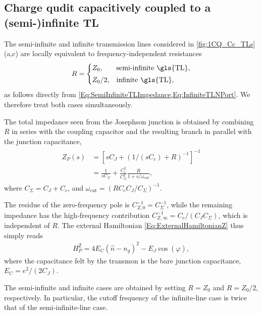 \documentclass[prx,aps,twocolumn,article]{revtex4-2}
\newcommand{\msf}[1]{\mathsf{#1}}
\newcommand{\msZ}{\msf{Z}}
\newcommand{\wcut}{\omega_{\text{cut}}}
\begin{document}
\subsection{Charge qudit capacitively coupled to a (semi-)infinite TL}
\label{Sec:ImpedanceSemiInf}

The semi-infinite and infinite transmission lines considered in \cref{fig:1CQ_Cc_TLs}(a,c) are locally equivalent to frequency-independent resistances
\begin{align}
    R=
    \begin{cases}
        Z_0, & \text{semi-infinite \gls{TL}},\\[1mm]
        Z_0/2, & \text{infinite \gls{TL}},
    \end{cases}
\end{align}
as follows directly from
\cref{Eq:SemiInfiniteTLImpedance,Eq:InfiniteTLNPort}. We therefore treat
both cases simultaneously.

The total impedance seen from the Josephson junction is obtained by
combining $R$ in series with the coupling capacitor and the resulting
branch in parallel with the junction capacitance,
\begin{align}
\begin{aligned}
    Z_P(s)
    &=
    \left[
        sC_J
        +
        \left(1/(s C_c)+R
        \right)^{-1}
    \right]^{-1}
    \\
    &=
    \frac{1}{sC_\Sigma}
    +
    \frac{C_c^2}{C_\Sigma^2}
    \frac{R}{1+s/\wcut},
\end{aligned}
\end{align}
where $C_\Sigma=C_J+C_c$, and $\wcut
    = \left( RC_cC_J/C_\Sigma\right)^{-1}$.

The residue of the zero-frequency pole is
$C_{Z,0}^{-1}=C_\Sigma^{-1}$, while the remaining impedance has the
high-frequency contribution $C_{Z,\infty}^{-1}  = C_c/(C_JC_\Sigma)$, which is independent of $R$. The external Hamiltonian
\cref{Eq:ExternalHamiltonianZ} thus simply reads
\begin{align}
    H_P^\msZ
    =
    4E_C(\hat n-n_g)^2
    -
    E_J\cos(\hat\varphi),
\end{align}
where the capacitance felt by the transmon is the bare junction
capacitance, $E_C=e^2/(2C_J)$.

The semi-infinite and infinite cases are obtained by setting
$R=Z_0$ and $R=Z_0/2$, respectively. In particular, the cutoff frequency
of the infinite-line case is twice that of the semi-infinite-line case.
\end{document}
